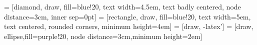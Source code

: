 
\newcommand\LensSph{} 				%
\def\LensSph[#1](#2,#3,#4,#5){%
	\pgfmathsetmacro\Tho{asin(0.5*#4/#5)}
	\filldraw[#1]  (#2- .5*#3,.5*#4) arc(-\Tho: \Tho: -#5)-- ++(-#2,0)-- ++(0,#4)--cycle;
}

 = [diamond, draw, fill=blue!20, text width=4.5em, text badly centered, node distance=3cm, inner sep=0pt]
 = [rectangle, draw, fill=blue!20, text width=5em, text centered, rounded corners, minimum height=4em]
 = [draw, -latex']
 = [draw, ellipse,fill=purple!20, node distance=3cm,minimum height=2em]

\usetikzlibrary{external}							
\tikzexternalize									%
\usepackage{letltxmacro}
\LetLtxMacro{\oldmissingfigure}{\missingfigure}
\renewcommand{\missingfigure}[2][]{\tikzexternaldisable\oldmissingfigure[{#1}]{#2}\tikzexternalenable}
\LetLtxMacro{\oldtodo}{\todo}
\renewcommand{\todo}[2][]{\tikzexternaldisable\oldtodo[#1]{#2}\tikzexternalenable}

%

